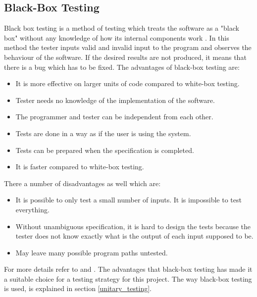 \documentclass[10pt, a4paper, titlepage]{article}
\begin{document}
\subsection{Black-Box Testing}
Black box testing is a method of testing which treats the software as a "black box" without any knowledge of how its internal components work \cite{ISTQB_book}. In this method the tester inputs valid and invalid input to the program and observes the behaviour of the software. If the desired results are not produced, it means that there is a bug which has to be fixed. The advantages of black-box testing are:
\begin{itemize}
\item It is more effective on larger units of code compared to white-box testing.
\item Tester needs no knowledge of the implementation of the software.
\item The programmer and tester can be independent from each other.
\item Tests are done in a way as if the user is using the system.
\item Tests can be prepared when the specification is completed.
\item It is faster compared to white-box testing.
\end{itemize}

There a number of disadvantages as well which are:
\begin{itemize}
\item It is possible to only test a small number of inputs. It is impossible to test everything.
\item Without unambiguous specification, it is hard to design the tests because the tester does not know exactly what is the output of each input supposed to be.
\item May leave many possible program paths untested.
\end{itemize}
For more details refer to \cite{ISTQB_book} and \cite{blackbox_site}. The advantages that black-box testing has made it a suitable choice for a testing strategy for this project. The way black-box testing is used, is explained in section \ref{unitary_testing}.
\end{document}
